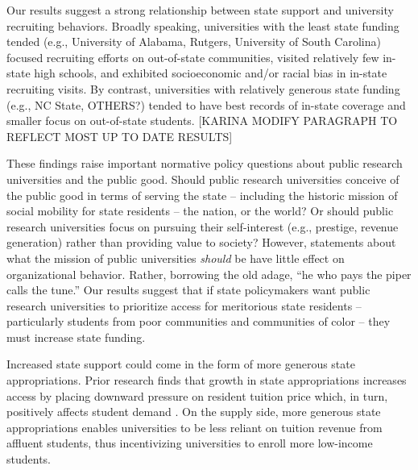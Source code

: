 \documentclass[twoside]{article}
\begin{document}
Our results suggest a strong relationship between state support and university recruiting behaviors.  Broadly speaking, universities with the least state funding tended (e.g., University of Alabama, Rutgers, University of South Carolina) focused recruiting efforts on out-of-state communities, visited relatively few in-state high schools, and exhibited socioeconomic and/or racial bias in in-state recruiting visits.  By contrast, universities with relatively generous state funding (e.g., NC State, OTHERS?) tended to have best records of in-state coverage and smaller focus on out-of-state students. [KARINA MODIFY PARAGRAPH TO REFLECT MOST UP TO DATE RESULTS]

These findings raise important normative policy questions about public research universities and the public good. Should public research universities conceive of the public good in terms of serving the state -- including the historic mission of social mobility for state residents -- the nation, or the world? Or should public research universities focus on pursuing their self-interest (e.g., prestige, revenue generation) rather than providing value to society? However, statements about what the mission of public universities \textit{should} be have little effect on organizational behavior. Rather, borrowing the old adage,
``he who pays the piper calls the tune.'' Our results suggest that if state policymakers want public research universities to prioritize access for meritorious state residents -- particularly students from poor communities and communities of color -- they must increase state funding.



Increased state support could come in the form of more generous state appropriations.  Prior research finds that growth in state appropriations increases access by placing downward pressure on resident tuition price \citep{RN2609} which, in turn, positively affects student demand \citep{RN3068}.  On the supply side, more generous state appropriations enables universities to be less reliant on tuition revenue from affluent students, thus incentivizing universities to enroll more low-income students.
\end{document}
